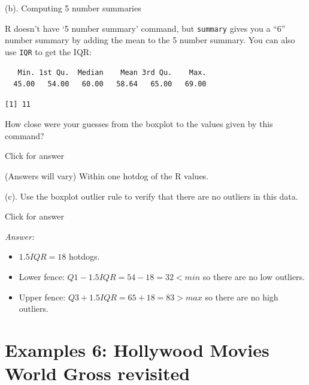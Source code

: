 \documentclass[
]{book}
\newenvironment{Shaded}{\begin{snugshade}}{\end{snugshade}}
\newcommand{\FunctionTok}[1]{\textcolor[rgb]{0.00,0.00,0.00}{#1}}
\newcommand{\NormalTok}[1]{#1}
\newcommand{\SpecialCharTok}[1]{\textcolor[rgb]{0.00,0.00,0.00}{#1}}
\providecommand{\tightlist}{%
  \setlength{\itemsep}{0pt}\setlength{\parskip}{0pt}}
\begin{document}
(b). Computing 5 number summaries

R doesn't have `5 number summary' command, but \texttt{summary} gives you a ``6'' number summary by adding the mean to the 5 number summary. You can also use \texttt{IQR} to get the IQR:

\begin{Shaded}
\end{Shaded}

\begin{verbatim}
   Min. 1st Qu.  Median    Mean 3rd Qu.    Max. 
  45.00   54.00   60.00   58.64   65.00   69.00 
\end{verbatim}

\begin{Shaded}
\end{Shaded}

\begin{verbatim}
[1] 11
\end{verbatim}

How close were your guesses from the boxplot to the values given by this command?

Click for answer

(Answers will vary) Within one hotdog of the R values.

(c). Use the boxplot outlier rule to verify that there are no outliers in this data.

Click for answer

\emph{Answer:}

\begin{itemize}
\tightlist
\item
  \(1.5IQR = 18\) hotdogs.
\item
  Lower fence: \(Q1 - 1.5 IQR = 54 - 18 = 32 < min\) so there are no low outliers.
\item
  Upper fence: \(Q3 + 1.5 IQR = 65 + 18 = 83 > max\) so there are no high outliers.
\end{itemize}

\hypertarget{examples-6-hollywood-movies-world-gross-revisited}{%
\section{Examples 6: Hollywood Movies World Gross revisited}\label{examples-6-hollywood-movies-world-gross-revisited}}
\end{document}

